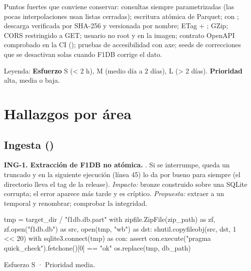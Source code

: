 Puntos fuertes que conviene conservar: consultas siempre parametrizadas (las pocas interpolaciones usan listas cerradas); escritura atómica de Parquet;  con ; descarga verificada por SHA-256 y versionada por nombre; ETag + ; GZip; CORS restringido a GET; usuario no root y  en la imagen; contrato OpenAPI comprobado en la CI (); pruebas de accesibilidad con axe; seeds de correcciones que se desactivan solas cuando F1DB corrige el dato.

Leyenda: \textbf{Esfuerzo} S (< 2 h), M (medio día a 2 días), L (> 2 días). \textbf{Prioridad} alta, media o baja.

\section{Hallazgos por área}

\subsection{Ingesta ()}

\textbf{ING-1. Extracción de F1DB no atómica.} . Si  se interrumpe, queda un  truncado y en la siguiente ejecución  (línea 45) lo da por bueno para siempre (el directorio lleva el tag de la release). \emph{Impacto:} bronze construido sobre una SQLite corrupta; el error aparece más tarde y es críptico. \emph{Propuesta:} extraer a un temporal y renombrar; comprobar la integridad.

\begin{codigo}
tmp = target_dir / "f1db.db.part"
with zipfile.ZipFile(zip_path) as zf, zf.open("f1db.db") as src, open(tmp, "wb") as dst:
    shutil.copyfileobj(src, dst, 1 << 20)
with sqlite3.connect(tmp) as con:
    assert con.execute("pragma quick_check").fetchone()[0] == "ok"
os.replace(tmp, db_path)
\end{codigo}

Esfuerzo S · Prioridad media.

